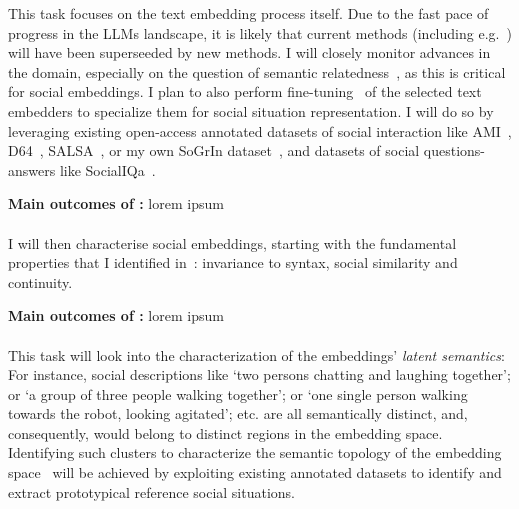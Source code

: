 This task focuses on the text embedding process itself. Due to the fast pace of
progress in the LLMs landscape, it is likely that current methods (including
e.g.~\cite{reimers2019sentencebert,muennighoff2022sgpt}) will have been
superseeded by new methods. I will closely monitor advances in the domain,
especially on the question of semantic relatedness~\cite{thakur2021beir}, as
this is critical for social embeddings. I plan to also perform
fine-tuning~\cite{hadsell2006dimensionality} of the selected text embedders to
specialize them for social situation representation. I will do so by leveraging
existing open-access annotated datasets of social interaction like
AMI~\cite{carletta2007ami}, D64~\cite{oertel2013d64},
SALSA~\cite{alameda2015salsa}, or my own SoGrIn dataset~\cite{webb2023sogrin},
and datasets of social questions-answers like SocialIQa~\cite{sap2019social}.

\begin{framed}
    {\noindent\bf Main outcomes of \tAB:} lorem ipsum 
\end{framed}

    \paragraph{\TAC}

\begin{rewrite}
I will then characterise social embeddings, starting with the fundamental
properties that I identified in~\cite{lemaignan2024social}: invariance to
syntax, social similarity and continuity. 
\end{rewrite}

\begin{framed}
    {\noindent\bf Main outcomes of \tAC:} lorem ipsum 
\end{framed}

\paragraph{\TAD}


This task will look into the characterization of the embeddings' \emph{latent
semantics}: For instance, social descriptions like `two persons chatting and
laughing together'; or `a group of three people walking together'; or `one
single person walking towards the robot, looking agitated'; etc.  are all
semantically distinct, and, consequently, would belong to distinct regions in
the embedding space. Identifying such clusters to characterize the semantic
topology of the embedding space~\cite{sun2023topological} will be achieved by
exploiting existing annotated datasets to identify and extract prototypical
reference social situations.

